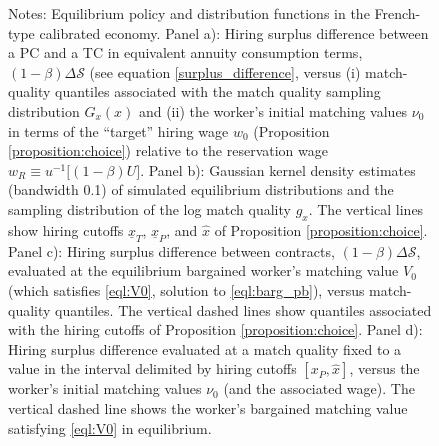 \documentclass[12pt,letterpaper]{article} %
\theoremstyle{plain}
\theoremstyle{definition}
\begin{document}
\begin{figure}[!h]
		\caption*{\footnotesize Notes: Equilibrium policy and distribution functions in the French-type calibrated economy. Panel a): Hiring surplus difference between a PC and a TC in equivalent annuity consumption terms, $(1-\beta) \Delta \mathcal{S}$ (see equation \eqref{surplus_difference}, versus (i) match-quality quantiles associated with the match quality sampling distribution $G_x(x)$ and (ii) the worker's initial matching values $\nu_0$ in terms of the ``target'' hiring wage $w_0$ (Proposition \ref{proposition:choice})  relative to the reservation wage $w_R \equiv u^{-1}\big[ (1-\beta) U\big]$. Panel b): Gaussian kernel density estimates (bandwidth 0.1) of simulated equilibrium distributions and the sampling distribution of the log match quality $g_x$. The vertical lines show hiring cutoffs $\underline{x}_T$, $\underline{x}_P$, and $\hat{x}$ of Proposition \ref{proposition:choice}. Panel c): Hiring surplus difference between contracts, $(1-\beta) \Delta \mathcal{S}$, evaluated at the equilibrium bargained worker's matching value $V_0$ (which satisfies \eqref{eql:V0}, solution to \eqref{eql:barg_pb}), versus match-quality quantiles. The vertical dashed lines show quantiles associated with the hiring cutoffs of Proposition \ref{proposition:choice}. Panel d): Hiring surplus difference evaluated at a match quality fixed to a value in the interval delimited by hiring cutoffs $[x_P, \hat{x}]$, versus the worker's initial matching values $\nu_0$ (and the associated wage). The vertical dashed line shows the worker's bargained matching value satisfying \eqref{eql:V0} in equilibrium.}
	\end{figure}
	
	\newpage
	
	\setcounter{table}{0}  
	\renewcommand{\thetable}{A\arabic{table}}
	
	
	
	
	
	\newpage
	
	
	
	
\end{document}
